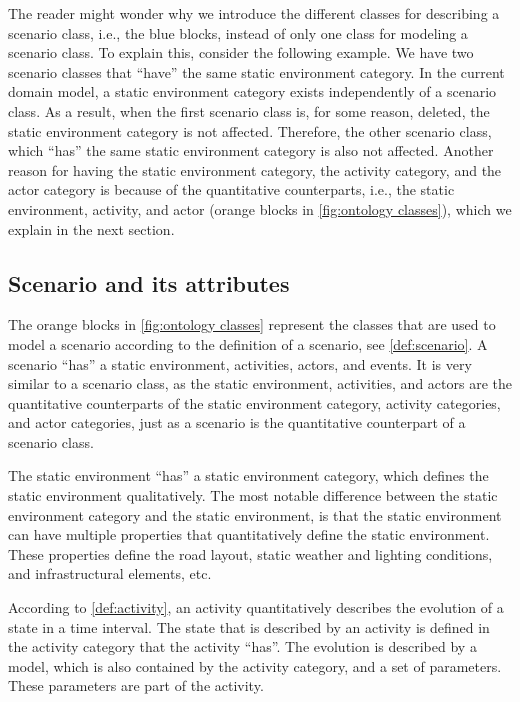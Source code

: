 The reader might wonder why we introduce the different classes for describing a scenario class, i.e., the blue blocks, instead of only one class for modeling a scenario class. To explain this, consider the following example. We have two scenario classes that ``have'' the same static environment category. In the current domain model, a static environment category exists independently of a scenario class. As a result, when the first scenario class is, for some reason, deleted, the static environment category is not affected. Therefore, the other scenario class, which ``has'' the same static environment category is also not affected. Another reason for having the static environment category, the activity category, and the actor category is because of the quantitative counterparts, i.e., the static environment, activity, and actor (orange blocks in \cref{fig:ontology classes}), which we explain in the next section.



\subsection{Scenario and its attributes}
\label{sec:domain scenario}

The orange blocks in \cref{fig:ontology classes} represent the classes that are used to model a scenario according to the definition of a scenario, see \cref{def:scenario}. A scenario ``has'' a static environment, activities, actors, and events. It is very similar to a scenario class, as the static environment, activities, and actors are the quantitative counterparts of the static environment category, activity categories, and actor categories, just as a scenario is the quantitative counterpart of a scenario class. 

The static environment ``has'' a static environment category, which defines the static environment qualitatively. The most notable difference between the static environment category and the static environment, is that the static environment can have multiple properties that quantitatively define the static environment. These properties define the road layout, static weather and lighting conditions, and infrastructural elements, etc.

According to \cref{def:activity}, an activity quantitatively describes the evolution of a state in a time interval. The state that is described by an activity is defined in the activity category that the activity ``has''. The evolution is described by a model, which is also contained by the activity category, and a set of parameters. These parameters are part of the activity. 

